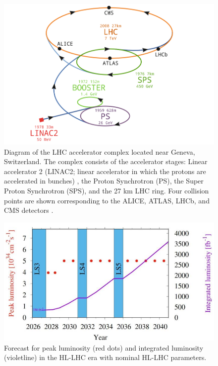 \documentclass[final,12pt]{article}
\begin{document}
\begin{figure}[H]
  \centering
  \includegraphics[width=0.7\columnwidth]{./LHC-cpx-book.png}
  \caption{Diagram of the LHC accelerator complex located near Geneva, Switzerland. The complex consists of the accelerator stages: Linear accelerator 2 (LINAC2; linear accelerator in which the protons are accelerated in bunches) , the Proton Synchrotron (PS), the Super Proton Synchrotron (SPS), and the 27 km LHC ring. Four collision points are shown corresponding to the ALICE, ATLAS, LHCb, and CMS detectors \cite{Zinser2018}.} %
  \label{figure5}
\end{figure}


\begin{figure}[H]
  \centering
  \includegraphics[width=0.8\columnwidth]{./lumint.png}
  \caption{Forecast for peak luminosity (red dots) and integrated luminosity (violetline) in the HL-LHC era with nominal HL-LHC parameters\cite{BejarAlonso:2749422}.}  %
  \label{figure6}
\end{figure}
\end{document}
